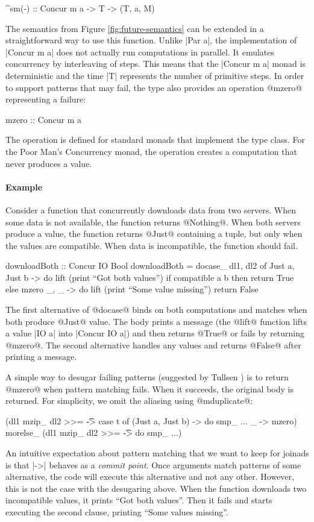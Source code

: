 \documentclass[preprint]{sigplanconf}
\begin{document}
\begin{code}
^sm(-) :: Concur m a -> T -> (T, a, M)
\end{code}
The semantics from Figure \ref{fig:future-semantics} can be extended in a straightforward way to use
this function. Unlike |Par a|, the implementation of |Concur m a| does not actually run computations in 
parallel. It emulates concurrency by interleaving of steps. This means that the |Concur m a| monad is 
deterministic and the time |T| represents the number of primitive steps. In order to support patterns 
that may fail, the type also provides an operation @mzero@ representing a failure:

\begin{code}
mzero :: Concur m a
\end{code}
The operation is defined for standard monads that implement the  type class. For the
Poor Man's Concurrency monad, the operation creates a computation that never produces a value.

\paragraph{Example} Consider a function that concurrently downloads data from two servers. When some
data is not available, the function returns @Nothing@. When both servers produce a value, the function
returns @Just@ containing a tuple, but only when the values are compatible. When data is incompatible,
the function should fail.

\begin{code}
downloadBoth :: Concur IO Bool
downloadBoth = docase_ dl1, dl2 of
  Just a, Just b -> do
    lift (print ``Got both values'')
    if compatible a b then return True else mzero
  _, _ -> do
    lift (print ``Some value missing'')
    return False
\end{code}
The first alternative of @docase@ binds on both computations and matches when both produce @Just@ value.
The body prints a message (the @lift@ function lifts a value |IO a| into |Concur IO a|) and then 
returns @True@ or fails by returning @mzero@. The second alternative handles any values and returns 
@False@ after printing a message.

A simple way to desugar failing patterns (suggested by Tullsen \cite{firstlcasspats}) is to return 
@mzero@ when pattern matching fails. When it succeeds, the original body is returned. For simplicity,
we omit the aliasing using @mduplicate@:

\begin{code}
(dl1 mzip_ dl2 >>= \t -> case t of 
    (Just a, Just b) -> do smp_ ...
    _ -> mzero) morelse_
(dl1 mzip_ dl2 >>= \t -> do smp_ ...)
\end{code}
An intuitive expectation about pattern matching that we want to keep for joinads is that 
|->| behaves as a \textit{commit point}. Once arguments match patterns of some alternative, the 
code will execute this alternative and not any other. However, this is not the case with the
desugaring above. When the function downloads two incompatible values, it prints ``Got both values''.
Then it fails and starts executing the second clause, printing ``Some values missing''.
\end{document}
